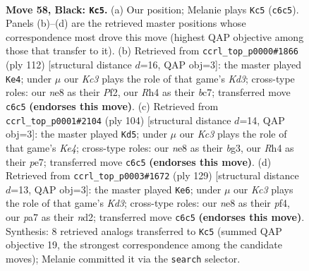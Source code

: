 \documentclass[11pt]{article}
\begin{document}
\clearpage

\begin{figure}[p]\centering
\begin{subfigure}{0.46\textwidth}\centering
\resizebox{\linewidth}{!}{%
\newchessgame
\chessboard[
  setfen={4N3/Pb3K2/2k1P3/8/7r/8/5p2/8 b - - 0 58},
  showmover=false,
  pgfstyle=straightmove, color=movearrow, markmove={c6-c5}
]}
\caption{}
\end{subfigure}\hfill
\begin{subfigure}{0.46\textwidth}\centering
\resizebox{\linewidth}{!}{%
\newchessgame
\chessboard[
  setfen={8/2b5/8/2p5/1k3p2/3K4/4BP2/8 w - - 4 57},
  showmover=false,
  pgfstyle=straightmove, color=movearrow, markmove={d3-e4}
]}
\caption{}
\end{subfigure}
\\[4pt]
\begin{subfigure}{0.46\textwidth}\centering
\resizebox{\linewidth}{!}{%
\newchessgame
\chessboard[
  setfen={8/4p3/8/p1P5/k3K3/3B2b1/8/8 w - - 1 53},
  showmover=false,
  pgfstyle=straightmove, color=movearrow, markmove={e4-d5}
]}
\caption{}
\end{subfigure}\hfill
\begin{subfigure}{0.46\textwidth}\centering
\resizebox{\linewidth}{!}{%
\newchessgame
\chessboard[
  setfen={8/4b3/3k4/8/5PK1/8/3N3P/8 b - - 26 65},
  showmover=false,
  pgfstyle=straightmove, color=movearrow, markmove={d6-e6}
]}
\caption{}
\end{subfigure}
\caption{\textbf{Move 58, Black: \texttt{Kc5}.} (a) Our position; Melanie plays \texttt{Kc5} (\texttt{c6c5}). Panels (b)--(d) are the retrieved master positions whose correspondence most drove this move (highest QAP objective among those that transfer to it). (b) Retrieved from \texttt{ccrl\_top\_p0000\#1866} (ply 112) [structural distance $d$=16, QAP obj=3]: the master played \texttt{Ke4}; under $\mu$ our \emph{Kc3} plays the role of that game's \emph{Kd3}; cross-type roles: our \emph{n}e8 as their \emph{P}f2, our \emph{R}h4 as their \emph{b}c7; transferred move \texttt{c6c5} \textbf{(endorses this move)}. (c) Retrieved from \texttt{ccrl\_top\_p0001\#2104} (ply 104) [structural distance $d$=14, QAP obj=3]: the master played \texttt{Kd5}; under $\mu$ our \emph{Kc3} plays the role of that game's \emph{Ke4}; cross-type roles: our \emph{n}e8 as their \emph{b}g3, our \emph{R}h4 as their \emph{p}e7; transferred move \texttt{c6c5} \textbf{(endorses this move)}. (d) Retrieved from \texttt{ccrl\_top\_p0003\#1672} (ply 129) [structural distance $d$=13, QAP obj=3]: the master played \texttt{Ke6}; under $\mu$ our \emph{Kc3} plays the role of that game's \emph{Kd3}; cross-type roles: our \emph{n}e8 as their \emph{p}f4, our \emph{p}a7 as their \emph{n}d2; transferred move \texttt{c6c5} \textbf{(endorses this move)}. Synthesis: 8 retrieved analogs transferred to \texttt{Kc5} (summed QAP objective 19, the strongest correspondence among the candidate moves); Melanie committed it via the \texttt{search} selector.}
\label{fig:thought-m115}
\end{figure}
\end{document}
